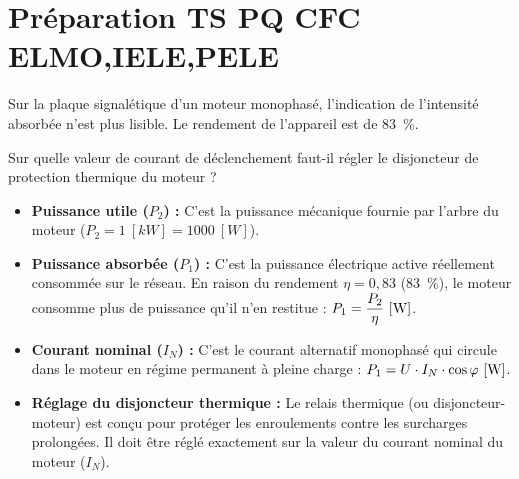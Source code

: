\documentclass[a4paper,12pt,answers,addpoints]{exam}
\begin{document}
	\unframedsolutions
	\pointsinmargin
	\bracketedpoints
	
\section*{Préparation TS PQ CFC ELMO,IELE,PELE}
\begin{questions}
\question[6] Sur la plaque signalétique d'un moteur monophasé, l'indication de l'intensité absorbée n'est plus lisible. Le rendement de l'appareil est de \qty{83}{\%}.
\begin{center}
\end{center}


Sur quelle valeur de courant de déclenchement faut-il régler le disjoncteur de protection thermique du moteur ?

\begin{solution}


\begin{itemize}
    \item \textbf{Puissance utile ($P_2$) :} C'est la puissance mécanique fournie par l'arbre du moteur ($P_2 = \qty{1}{[kW]} = \qty{1000}{[W]}$).
    \item \textbf{Puissance absorbée ($P_1$) :} C'est la puissance électrique active réellement consommée sur le réseau. En raison du rendement $\eta = 0,83$ (\qty{83}{\%}), le moteur consomme plus de puissance qu'il n'en restitue : $P_1 = \dfrac{P_2}{\eta} \ \unit[]{[\watt]}$.
    \item \textbf{Courant nominal ($I_N$) :} C'est le courant alternatif monophasé qui circule dans le moteur en régime permanent à pleine charge : $P_1 = U \cdot I_N \cdot \cos\varphi \ \unit[]{[\watt]}$.
    \item \textbf{Réglage du disjoncteur thermique :} Le relais thermique (ou disjoncteur-moteur) est conçu pour protéger les enroulements contre les surcharges prolongées. Il doit être réglé exactement sur la valeur du courant nominal du moteur ($I_N$).
\end{itemize}



\end{solution}
\end{questions}
\end{document}
